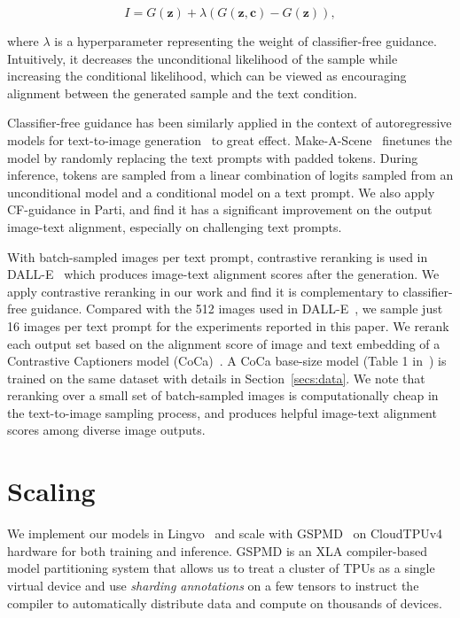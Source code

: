 \begin{equation}  \label{eq:cf_eq}
I = G(\mathbf {z}) + \lambda (G(\mathbf {z}, \mathbf{c}) - G(\mathbf {z})),
\end{equation}

where $\lambda$ is a hyperparameter representing the weight of classifier-free guidance. Intuitively, it decreases the unconditional likelihood of the sample while increasing the conditional likelihood, which can be viewed as encouraging alignment between the generated sample and the text condition.

Classifier-free guidance has been similarly applied in the context of autoregressive models for text-to-image generation~\cite{crowson2021classifier, gafni2022make} to great effect. Make-A-Scene~\cite{gafni2022make} finetunes the model by randomly replacing the text prompts with padded tokens. During inference, tokens are sampled from a linear combination of logits sampled from an unconditional model and a conditional model on a text prompt. We also apply CF-guidance in Parti, and find it has a significant improvement on the output image-text alignment, especially on challenging text prompts.

With batch-sampled images per text prompt, contrastive reranking is used in DALL-E~\cite{ramesh2021zero} which produces image-text alignment scores after the generation. We apply contrastive reranking in our work and find it is complementary to classifier-free guidance. Compared with the 512 images used in DALL-E~\cite{ramesh2021zero}, we sample just 16 images per text prompt for the experiments reported in this paper. We rerank each output set based on the alignment score of image and text embedding of a Contrastive Captioners model (CoCa)~\cite{yu2022coca}. A CoCa base-size model (Table 1 in~\cite{yu2022coca}) is trained on the same dataset with details in Section~\ref{secs:data}. We note that reranking over a small set of batch-sampled images is computationally cheap in the text-to-image sampling process, and produces helpful image-text alignment scores among diverse image outputs.

\section{Scaling}
We implement our models in Lingvo~\cite{shen2019lingvo} and scale with GSPMD~\cite{xu2021gspmd} on CloudTPUv4 hardware for both training and inference. GSPMD is an XLA compiler-based model partitioning system that allows us to treat a cluster of TPUs as a single virtual device and use \emph{sharding annotations} on a few tensors to instruct the compiler to automatically distribute data and compute on thousands of devices.

